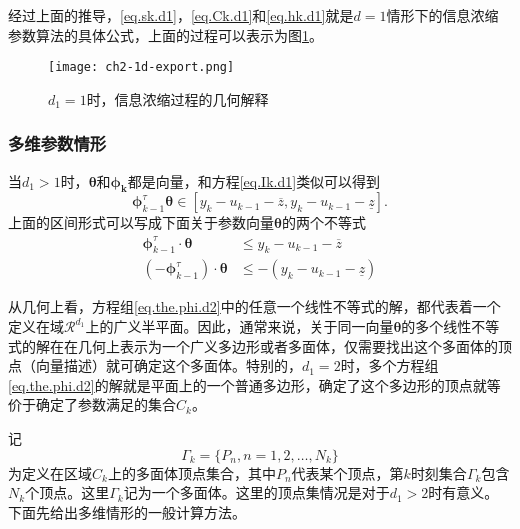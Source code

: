 经过上面的推导，\eqref{eq.sk.d1}，\eqref{eq.Ck.d1}和\eqref{eq.hk.d1}就是$d=1$情形下的信息浓缩参数算法的具体公式，上面的过程可以表示为图\ref{fig.1d.export}。
\begin{figure}
	\centering
	\texttt{[image: ch2-1d-export.png]}\\	 %
	\caption{$d_{1}=1$时，信息浓缩过程的几何解释}
	\label{fig.1d.export}
\end{figure}

\subsubsection{多维参数情形}\label{subsubsect:2.3.3.2}
当$d_{1}>1$时，$\bm{\theta}$和$\bm{\phi_{k}}$都是向量，和方程\eqref{eq.Ik.d1}类似可以得到
\begin{equation}%
\label{eq.the.phi.d2}
\bm{\phi}_{k-1}^{\tau}\bm{\theta}\in[y_{k}-u_{k-1}-\overline{z},y_{k}-u_{k-1}-\underline{z}].
\end{equation}
上面的区间形式可以写成下面关于参数向量$\bm{\theta}$的两个不等式
\begin{equation}%
\label{eq.the.phi.d2}
\begin{split}%
\bm{\phi}_{k-1}^{\tau}\cdot\bm{\theta}&\leq y_{k}-u_{k-1}-\overline{z}\\
(-\bm{\phi}_{k-1}^{\tau})\cdot\bm{\theta}&\leq -(y_{k}-u_{k-1}-\underline{z})
\end{split}
\end{equation}

从几何上看，方程组\eqref{eq.the.phi.d2}中的任意一个线性不等式的解，都代表着一个定义在域$\mathcal{R}^{d_{1}}$上的广义半平面。因此，通常来说，关于同一向量$\bm{\theta}$的多个线性不等式的解在在几何上表示为一个广义多边形或者多面体，仅需要找出这个多面体的顶点（向量描述）就可确定这个多面体。特别的，$d_{1}=2$时，多个方程组\eqref{eq.the.phi.d2}的解就是平面上的一个普通多边形，确定了这个多边形的顶点就等价于确定了参数满足的集合$C_{k}$。

记
\begin{equation}%
\label{eq.Vk}
\Gamma_{k}=\{P_{n},n=1,2,\ldots,N_{k}\}
\end{equation}
为定义在区域$C_{k}$上的多面体顶点集合，其中$P_{n}$代表某个顶点，第$k$时刻集合$\Gamma_{k}$包含$N_{k}$个顶点。这里$\Gamma_{k}$记为一个多面体。这里的顶点集情况是对于$d_{1}>2$时有意义。下面先给出多维情形的一般计算方法。

